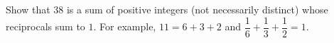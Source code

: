 Show that $38$ is a sum of positive integers (not necessarily distinct) whose reciprocals sum to $1$. For example, $11=6+3+2$ and $\dfrac16+\dfrac13+\dfrac12=1$.
